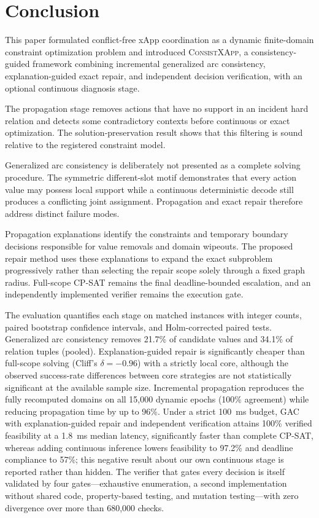 \documentclass[pdflatex,sn-mathphys-num,iicol,oneside]{sn-jnl}
\newcommand{\method}{\textsc{ConsistXApp}}
\begin{document}
\section{Conclusion}
\label{sec:conclusion}

This paper formulated conflict-free xApp coordination as a dynamic
finite-domain constraint optimization problem and introduced
\method, a consistency-guided framework combining incremental
generalized arc consistency, explanation-guided exact repair, and
independent decision verification, with an optional continuous
diagnosis stage.

The propagation stage removes actions that have no support in an
incident hard relation and detects some contradictory contexts before
continuous or exact optimization. The solution-preservation result
shows that this filtering is sound relative to the registered
constraint model.

Generalized arc consistency is deliberately not presented as a
complete solving procedure. The symmetric different-slot motif
demonstrates that every action value may possess local support while a
continuous deterministic decode still produces a conflicting joint
assignment. Propagation and exact repair therefore address distinct
failure modes.

Propagation explanations identify the constraints and temporary
boundary decisions responsible for value removals and domain wipeouts.
The proposed repair method uses these explanations to expand the exact
subproblem progressively rather than selecting the repair scope solely
through a fixed graph radius. Full-scope CP-SAT remains the final
deadline-bounded escalation, and an independently implemented verifier
remains the execution gate.

The evaluation quantifies each stage on matched instances with integer
counts, paired bootstrap confidence intervals, and Holm-corrected
paired tests. Generalized arc consistency removes 21.7\% of candidate
values and 34.1\% of relation tuples (pooled). Explanation-guided
repair is significantly cheaper than full-scope solving (Cliff's
$\delta=-0.96$) with a strictly local core, although the observed
success-rate differences between core strategies are not statistically
significant at the available sample size. Incremental propagation
reproduces the fully recomputed domains on all 15{,}000 dynamic epochs
(100\% agreement) while reducing propagation time by up to 96\%. Under
a strict 100~ms budget, GAC with explanation-guided repair and
independent verification attains 100\% verified feasibility at a
1.8~ms median latency, significantly faster than complete CP-SAT,
whereas adding continuous inference lowers feasibility to 97.2\% and
deadline compliance to 57\%; this negative result about our own
continuous stage is reported rather than hidden. The verifier that
gates every decision is itself validated by four gates---exhaustive
enumeration, a second implementation without shared code,
property-based testing, and mutation testing---with zero divergence
over more than 680{,}000 checks.
\end{document}
